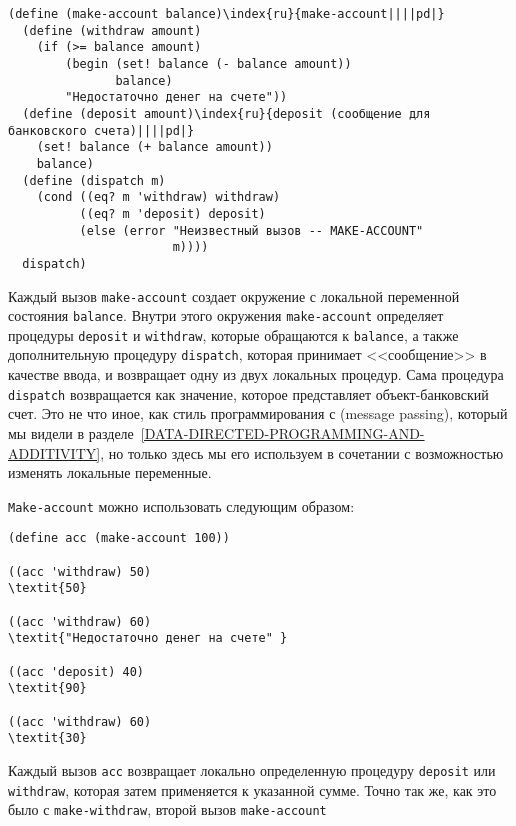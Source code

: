 \begin{Verbatim}[fontsize=\small]
(define (make-account balance)\index{ru}{make-account||||pd|}
  (define (withdraw amount)
    (if (>= balance amount)
        (begin (set! balance (- balance amount))
               balance)
        "Недостаточно денег на счете"))
  (define (deposit amount)\index{ru}{deposit (сообщение для банковского счета)||||pd|}
    (set! balance (+ balance amount))
    balance)
  (define (dispatch m)
    (cond ((eq? m 'withdraw) withdraw)
          ((eq? m 'deposit) deposit)
          (else (error "Неизвестный вызов -- MAKE-ACCOUNT"
                       m))))
  dispatch)
\end{Verbatim}
Каждый вызов
{\tt make-account} создает окружение с локальной переменной
состояния {\tt balance}.  Внутри этого окружения
{\tt make-account} определяет процедуры {\tt deposit} и
{\tt withdraw}, которые обращаются к {\tt balance}, а
также дополнительную процедуру {\tt dispatch}, которая
принимает <<сообщение>> в качестве ввода, и возвращает одну из двух
локальных процедур.  Сама процедура {\tt dispatch} возвращается
как значение, которое представляет объект-банковский счет.  Это не что
иное, как стиль программирования с
 (message passing), который мы видели в
разделе~\ref{DATA-DIRECTED-PROGRAMMING-AND-ADDITIVITY}, но только
здесь мы его используем в сочетании с возможностью изменять локальные
переменные.

{\tt Make-account} можно использовать следующим
образом:

\begin{Verbatim}[fontsize=\small]
(define acc (make-account 100))

((acc 'withdraw) 50)
\textit{50}

((acc 'withdraw) 60)
\textit{"Недостаточно денег на счете" }

((acc 'deposit) 40)
\textit{90}

((acc 'withdraw) 60)
\textit{30}
\end{Verbatim}
Каждый вызов {\tt acc} возвращает локально определенную процедуру
{\tt deposit} или {\tt withdraw}, которая затем
применяется к указанной сумме.  Точно так же, как это было с
{\tt make-withdraw}, второй вызов {\tt make-account}

